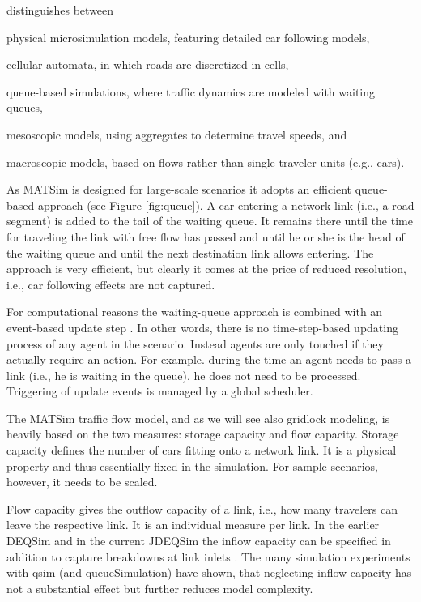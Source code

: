 \citet[][]{CharyparEtAl_TRB_2009} distinguishes between 
\begin{compactitem}
\item physical microsimulation models, featuring detailed car following models,
\item cellular automata, in which roads are discretized in cells,
\item queue-based simulations, where traffic dynamics are modeled with waiting queues,
\item mesoscopic models, using aggregates to determine travel speeds, and
\item macroscopic models, based on flows rather than single traveler units (e.g., cars).
\end{compactitem}

As MATSim is designed for large-scale scenarios it adopts an efficient queue-based approach (see Figure \ref{fig:queue}). A car entering a network link (i.e., a road segment) is added to the tail of the waiting queue. It remains there until the time for traveling the link with free flow has passed and until he or she is the head of the waiting queue and until the next destination link allows entering. The approach is very efficient, but clearly it comes at the price of reduced resolution, i.e., car following effects are not captured.   

For computational reasons the waiting-queue approach is combined with an event-based update step \citep[][]{CharyparEtAl_TRB_2009}. In other words, there is no time-step-based updating process of any agent in the scenario. Instead agents are only touched if they actually require an action. For example. during the time an agent needs to pass a link (i.e., he is waiting in the queue), he does not need to be processed. Triggering of update events is managed by a global scheduler.

The MATSim traffic flow model, and as we will see also gridlock modeling, is heavily based on the two measures: storage capacity and flow capacity. Storage capacity defines the number of cars fitting onto a network link. It is a physical property and thus essentially fixed in the simulation. For sample scenarios, however, it needs to be scaled.

Flow capacity gives the outflow capacity of a link, i.e., how many travelers can leave the respective link. It is an individual measure per link. In the earlier DEQSim and in the current JDEQSim the inflow capacity can be specified in addition to capture breakdowns at link inlets \citep[][p.99]{Charypar_PhDThesis_2008}. The many simulation experiments with qsim (and queueSimulation) have shown, that neglecting inflow capacity has not a substantial effect but further reduces model complexity. 

